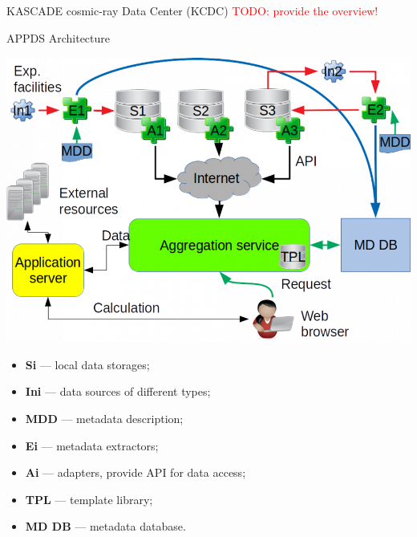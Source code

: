 \begin{frame}{KASCADE cosmic-ray Data Center (KCDC)}
 \textcolor{red}{TODO: provide the overview!}
\end{frame}


\begin{frame}{APPDS Architecture}
\begin{minipage}[c]{0.63\textwidth}
  \includegraphics[width=1\textwidth]{pics/arch_appds.png}
\end{minipage}
\hfill
\begin{minipage}[c]{0.36\textwidth}
  \small
  \begin{itemize}
    \setlength{\itemsep}{0pt}
    \item\textbf{Si} — local data storages;
    \item\textbf{Ini} — data sources of different types;
    \item\textbf{MDD} — metadata description;
    \item\textbf{Ei} — metadata extractors;
    \item\textbf{Ai} — adapters, provide API for data access;
    \item\textbf{TPL} — template library;
    \item\textbf{MD DB} — metadata database.
  \end{itemize}
\end{minipage}
\end{frame}



